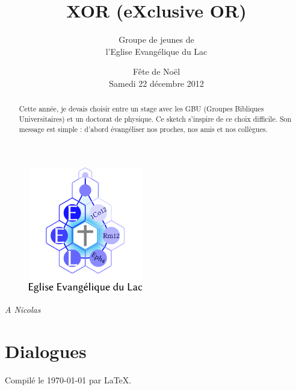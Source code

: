 \documentclass[12pt]{article}
\title{XOR (eXclusive OR)}
\author{Groupe de jeunes de \\ l'Eglise Evangélique du Lac}
\date{Fête de Noël \\ Samedi 22 décembre 2012}
\begin{document}
\maketitle

	\begin{figure}[htb]
	\centering
	\includegraphics[width=5cm]{Figures/logoEEL11}
	\end{figure}

\newpage

\begin{center}
\textit{A Nicolas}
\end{center}

\vfill

\begin{abstract}
Cette année, je devais choisir entre un stage avec les GBU
(Groupes Bibliques Universitaires) et un doctorat de physique.
Ce sketch s'inspire de ce choix difficile.
Son message est simple : d'abord évangéliser nos proches,
nos amis et nos collègues.
\end{abstract}

\setcounter{tocdepth}{2}
\tableofcontents

\vfill

\newpage



\newpage

\section{Dialogues}

	
	
	
	
\newpage
	


\vfill

\begin{center}
Compilé le \today{} par \LaTeX{}.
\end{center}
\end{document}
